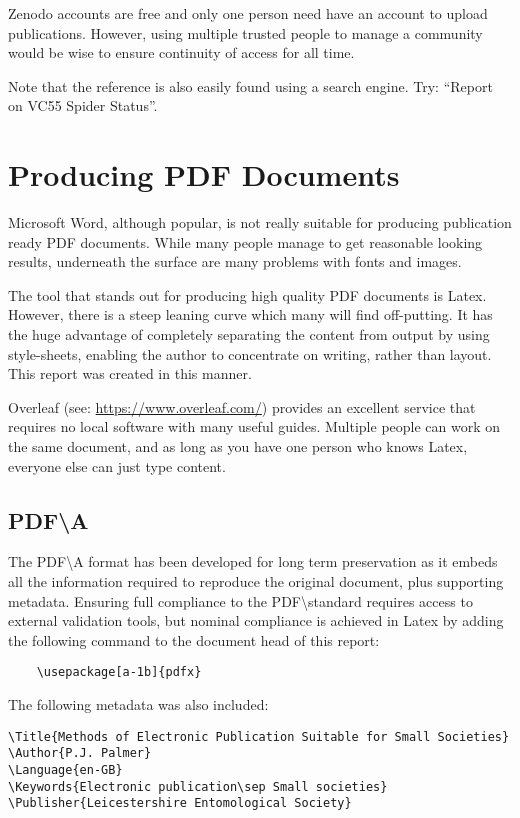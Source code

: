 \documentclass{article}
\begin{document}
Zenodo accounts are free and only one person need have an account to upload publications. However, using multiple trusted people to manage a community would be wise to ensure continuity of access for all time.

Note that the reference is also easily found using a search engine. Try: \enquote{Report on VC55 Spider Status}.

\section{Producing PDF Documents}

Microsoft Word, although popular, is not really suitable for producing publication ready PDF documents. While many people manage to get reasonable looking results, underneath the surface are many problems with fonts and images.

The tool that stands out for producing high quality PDF documents is Latex. However, there is a steep leaning curve which many will find off-putting.  It has the huge advantage of completely separating the content from output by using style-sheets, enabling the author to concentrate on writing, rather than layout. This report was created in this manner.

Overleaf (see: \url{https://www.overleaf.com/})  provides an excellent service that requires no local software with many useful guides. Multiple people can work on the same document, and as long as you have one person who knows Latex, everyone else can just type content.

\subsection{PDF\textbackslash A}

The PDF\textbackslash A format has been developed for long term preservation  as it embeds all the information required to reproduce the original document, plus supporting metadata. Ensuring full compliance to the PDF\textbackslash standard requires access to external validation tools, but nominal compliance is achieved in Latex by adding the following command to the document head of this report:
 \begin{verbatim}
	\usepackage[a-1b]{pdfx}
\end{verbatim}

The following metadata was also included:
 \begin{verbatim}
\Title{Methods of Electronic Publication Suitable for Small Societies}
\Author{P.J. Palmer}
\Language{en-GB}
\Keywords{Electronic publication\sep Small societies}
\Publisher{Leicestershire Entomological Society}
\end{verbatim}
 
\end{document}
